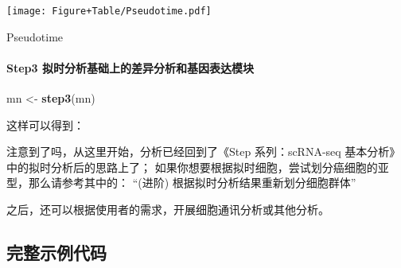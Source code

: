 \documentclass[
]{article}
\newenvironment{Shaded}{\begin{snugshade}}{\end{snugshade}}
\newcommand{\CommentTok}[1]{\textcolor[rgb]{0.56,0.35,0.01}{\textit{#1}}}
\newcommand{\KeywordTok}[1]{\textcolor[rgb]{0.13,0.29,0.53}{\textbf{#1}}}
\newcommand{\NormalTok}[1]{#1}
\newcommand{\OperatorTok}[1]{\textcolor[rgb]{0.81,0.36,0.00}{\textbf{#1}}}
\newcommand{\StringTok}[1]{\textcolor[rgb]{0.31,0.60,0.02}{#1}}
\begin{document}
\def\@captype{figure}
\begin{center}
\texttt{[image: Figure+Table/Pseudotime.pdf]}
\caption{Pseudotime}\label{fig:Pseudotime}
\end{center}

\hypertarget{step3-ux62dfux65f6ux5206ux6790ux57faux7840ux4e0aux7684ux5deeux5f02ux5206ux6790ux548cux57faux56e0ux8868ux8fbeux6a21ux5757}{%
\paragraph{Step3 拟时分析基础上的差异分析和基因表达模块}\label{step3-ux62dfux65f6ux5206ux6790ux57faux7840ux4e0aux7684ux5deeux5f02ux5206ux6790ux548cux57faux56e0ux8868ux8fbeux6a21ux5757}}

\begin{Shaded}
\begin{Highlighting}[]
\NormalTok{mn \textless{}{-}}\StringTok{ }\KeywordTok{step3}\NormalTok{(mn)}
\end{Highlighting}
\end{Shaded}

这样可以得到：

\begin{Shaded}
\end{Shaded}

注意到了吗，从这里开始，分析已经回到了《Step 系列：scRNA-seq 基本分析》中的拟时分析后的思路上了；
如果你想要根据拟时细胞，尝试划分癌细胞的亚型，那么请参考其中的： ``(进阶) 根据拟时分析结果重新划分细胞群体''

之后，还可以根据使用者的需求，开展细胞通讯分析或其他分析。

\hypertarget{ux5b8cux6574ux793aux4f8bux4ee3ux7801}{%
\subsection{完整示例代码}\label{ux5b8cux6574ux793aux4f8bux4ee3ux7801}}
\end{document}
